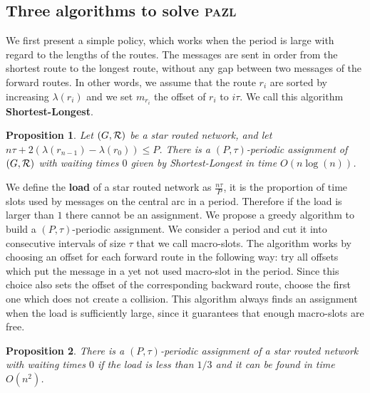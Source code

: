 \documentclass[10pt, conference, letterpaper]{IEEEtran}
\newtheorem{proposition}{Proposition}
\newcommand\pazl{\textsc{pazl}\xspace}
\begin{document}
    \subsection{Three algorithms to solve \pazl}

    We first present a simple policy, which works when the period is large with regard to the lengths of the routes.
    The messages are sent in order from the shortest route to the longest route, without any gap between two messages of the forward routes.
    In other words, we assume that the route $r_i$ are sorted by increasing $\lambda(r_i)$ and we set $m_{r_i}$ the offset of $r_i$ to $i\tau$. We call this algorithm {\bf Shortest-Longest}.
    
      \begin{proposition} Let $(G, {\cal R})$ be a star routed network, and let $n\tau + 2(\lambda(r_{n-1}) - \lambda(r_{0})) \leq P$. There is a $(P,\tau)$-periodic assignment of $(G, {\cal R})$ with waiting times $0$ given by Shortest-Longest in time $O(n\log(n))$.\label{prop:SL}
      \end{proposition}

      

      We define the \textbf{load} of a star routed network as $\frac{n\tau}{P}$, it is the proportion of time slots used by messages on the central arc in a period. Therefore if the load is larger than $1$ there cannot be an assignment. We propose a greedy algorithm to build a $(P,\tau)$-periodic assignment. We consider a period and cut it into consecutive intervals of size $\tau$ that we call macro-slots. The algorithm works by choosing an offset for each forward route in the following way: try all offsets which put the message in a yet not used macro-slot in the period. Since this choice also sets the offset of the corresponding backward route, choose the first one which does not create a collision. This algorithm always finds an assignment when the load is sufficiently large, since it guarantees that enough macro-slots are free.
      
      \begin{proposition}
    There is a $(P,\tau)$-periodic assignment of a star routed network with waiting times $0$ if the load is less than $1/3$ and it can be found in time $O(n^2)$.
    \end{proposition}
    
\end{document}
